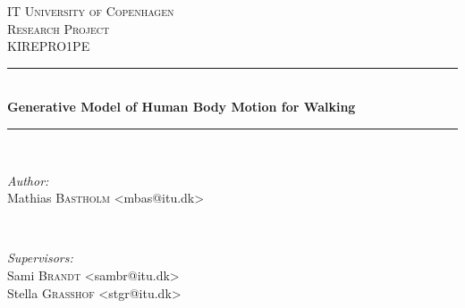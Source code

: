 \begin{titlepage}

\newcommand{\HRule}{\rule{\linewidth}{0.5mm}} %

\center %


\textsc{\LARGE IT University of Copenhagen}\\[1.5cm] %
\textsc{\Large Research Project}\\[0.5cm] %
\textsc{\large KIREPRO1PE}\\[0.5cm] %


\HRule \\[0.4cm]
{ \huge \bfseries Generative Model of Human Body Motion for Walking}\\[0.4cm] %
\HRule \\[1.5cm]


\begin{minipage}{0.4\textwidth}
\begin{flushleft} \large
\emph{Author:}\\
Mathias \textsc{Bastholm} <mbas@itu.dk>
\end{flushleft}
\end{minipage}
~
\begin{minipage}{0.4\textwidth}
\begin{flushright} \large
\emph{Supervisors:} \\
Sami \textsc{Brandt} <sambr@itu.dk>\\
Stella \textsc{Grasshof} <stgr@itu.dk>
\end{flushright}
\end{minipage}\\[4cm]



\end{titlepage}

